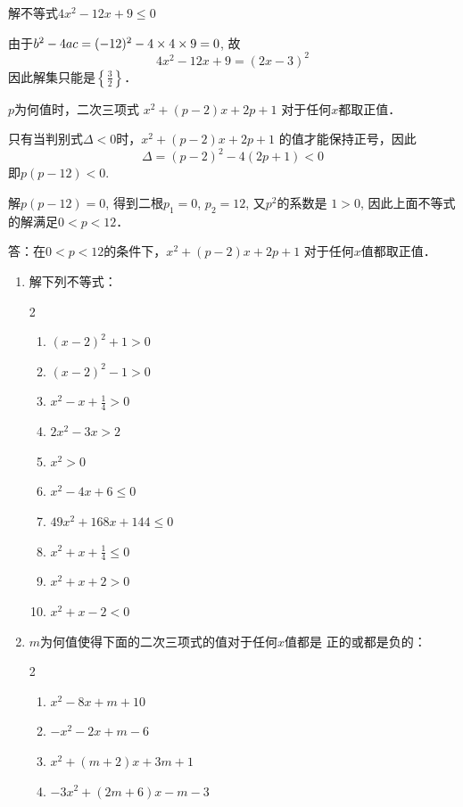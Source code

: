 \begin{example}
解不等式$4x^2-12x+9\le 0$
\end{example}

\begin{solution}
    由于$b^2-4ac=(-12)^2-4\times4\times9=0$, 故
\[4x^2-12x+9=(2x-3)^2\]
因此解集只能是$\left\{\frac{3}{2}\right\}$．
\end{solution}


\begin{example}
    $p$为何值时，二次三项式
$x^2+(p-2)x+2p+1$
对于任何$x$都取正值．
\end{example}


\begin{solution}
    只有当判别式$\Delta<0$时，$x^2+(p-2)x+2p+1$
的值才能保持正号，因此
$$\Delta=(p-2)^2-4(2p+1)<0$$
即$p(p-12)<0$.

解$p(p-12)=0$, 得到二根$p_1=0$, $p_2=12$, 又$p^2$的系数是
$1>0$, 因此上面不等式的解满足$0<p<12$．

答：在$0<p<12$的条件下，$x^2+(p-2)x+2p+1$
对于任何$x$值都取正值．
\end{solution}


\begin{ex}
\begin{enumerate}
    \item 解下列不等式：
\begin{multicols}{2}
\begin{enumerate}
    \item $(x-2)^2+1>0$
    \item $(x-2)^2-1>0$
    \item $x^2-x+\frac{1}{4}>0$
    \item $2x^2-3x>2$
    \item $x^2>0$
    \item $x^2-4x+6\le 0$
    \item $49x^2+168x+144\le 0$
    \item $x^2+x+\frac{1}{4}\le 0$
    \item $x^2+x+2>0$
    \item $x^2+x-2<0$
\end{enumerate}
\end{multicols}
    \item $m$为何值使得下面的二次三项式的值对于任何$x$值都是
    正的或都是负的：
\begin{multicols}{2}
\begin{enumerate}
    \item $x^2-8x+m+10$
    \item $-x^2-2x+m-6$
    \item $x^2+(m+2)x+3m+1$
    \item $-3x^2+(2m+6)x-m-3$
\end{enumerate}
\end{multicols}
\end{enumerate}    
\end{ex}

